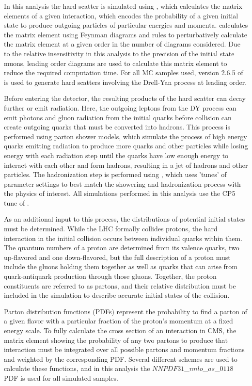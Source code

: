 In this analysis the hard scatter is simulated using \mg, which calculates the matrix elements of a given interaction, which encodes the probability of a given initial state to produce outgoing particles of particular energies and momenta.
\mg calculates the matrix element using Feynman diagrams and rules to perturbatively calculate the matrix element at a given order in the number of diagrams considered.
Due to the relative insensitivity in this analysis to the precision of the initial state muons, leading order diagrams are used to calculate this matrix element to reduce the required computation time.
For all MC samples used, version 2.6.5 of \mg is used to generate hard scatters involving the Drell-Yan process at leading order. 

Before entering the detector, the resulting products of the hard scatter can decay further or emit radiation.
Here, the outgoing leptons from the DY process can emit photons and gluon radiation from the initial quarks before collision can create outgoing quarks that must be converted into hadrons. 
This process is performed using parton shower models, which simulate the process of high energy quarks emitting radiation to produce more quarks and other particles while losing energy with each radiation step until the quarks have low enough energy to interact with each other and form hadrons, resulting in a jet of hadrons and other particles.
The hadronization step is performed using \pythia, which uses 'tunes' of parameter settings to best match the showering and hadronization process with the physics of interest. 
All simulations performed in this analysis use the CP5 tune of \pythia \cite{pythia_tune}. 

As an additional input to this process, the distributions of potential initial states must be determined.
While the LHC formally collides protons, the hard interaction in the initial collision occurs between individual quarks within them.
The quantum numbers of a proton are determined from its valence quarks, two up-flavored and one down-flavored, but the full description of a proton must include the gluons holding them together as well as quarks that can arise from quark-antiquark production through those gluons. 
Together, the proton constituents are referred to as partons, and their relative distribution must be included in the simulation to describe accurate initial states of the collision.

Parton distribution functions (PDFs) represent the probability to find a parton of a given flavor with a particular fraction of the proton's momentum at a fixed energy scale.
To fully calculate the cross section of an interaction in CMS, the matrix element showing the probability of any two partons to produce that interaction must be integrated over all possible partons and momentum fractions and weighted by the corresponding PDF. 
Several different schemes are used to calculate these functions, and in this analysis the $NNPDF31$\_$nnlo$\_$as$\_$0118$ PDF \cite{nnpdf} is used for all simulated samples.

